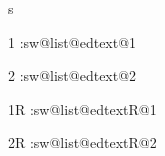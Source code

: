 \documentclass[]{article}
\begin{document}
\makeatletter


\begin{pairs}
\begin{Rightside}
\beginnumbering

\pstart 
	 
\pend
\endnumbering
\end{Rightside}
\begin{Leftside}
\beginnumbering

\pstart 
  s
	 
\pend
\endnumbering
\end{Leftside}

\end{pairs}
\Columns

1 :\expandafter\meaning\csname sw@list@edtext@1\endcsname

2 :\expandafter\meaning\csname sw@list@edtext@2\endcsname

1R :\expandafter\meaning\csname sw@list@edtextR@1\endcsname

2R :\expandafter\meaning\csname sw@list@edtextR@2\endcsname
\end{document}

